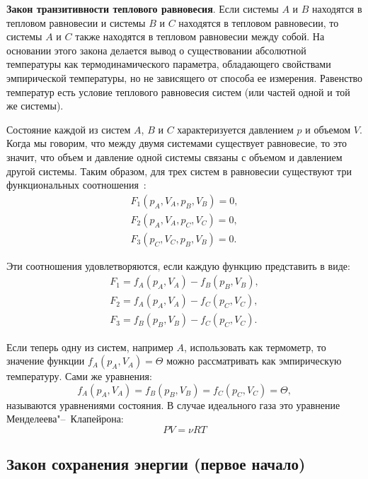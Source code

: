 \documentclass[12pt,a4paper,oneside]{book}
\begin{document}
{\bf Закон транзитивности теплового равновесия}. Если системы $A$ и $B$ находятся в тепловом равновесии и системы $B$ и $C$ находятся в тепловом равновесии, то системы $A$ и $C$ также находятся в тепловом равновесии между собой. На основании этого закона делается вывод о существовании абсолютной температуры как термодинамического параметра, обладающего свойствами эмпирической температуры, но не зависящего от способа ее измерения. Равенство температур есть условие теплового равновесия систем (или частей одной и той же системы).

Состояние каждой из систем $A$, $B$ и $C$ характеризуется давлением $p$ и объемом $V$. Когда мы говорим, что между двумя системами существует равновесие, то это значит, что объем и давление одной системы связаны с объемом и давлением другой системы. Таким образом, для трех систем в равновесии существуют три функциональных соотношения~\cite{Osipov1999a}:
\begin{equation}
	\begin{aligned}
		F_1 (p_A, V_A, p_B, V_B) = 0, \\
		F_2 (p_A, V_A, p_C, V_C) = 0, \\
		F_3 (p_C, V_C, p_B, V_B) = 0.
	\end{aligned}
\end{equation}

Эти соотношения удовлетворяются, если каждую функцию представить в виде: 
\begin{equation}
	\begin{aligned}
		F_1 = f_A (p_A, V_A) - f_B (p_B, V_B),\\
		F_2 = f_A (p_A, V_A) - f_C (p_C, V_C),\\
		F_3 = f_B (p_B, V_B) - f_C (p_C, V_C).
	\end{aligned}
\end{equation}

Если теперь одну из систем, например $A$, использовать как термометр, то значение функции $f_A (p_A, V_A) = \Theta$ можно рассматривать как эмпирическую температуру. Сами же уравнения:
\begin{equation}
	f_A(p_A, V_A)=f_B(p_B, V_B)=f_C(p_C, V_C)=\Theta,
\end{equation}
называются уравнениями состояния. В случае идеального газа это уравнение Менделеева"--~Клапейрона:
\begin{equation}
	\label{mendeleev}
	P V = \nu R T
\end{equation}

\subsection{Закон сохранения энергии (первое начало)}
\end{document}
